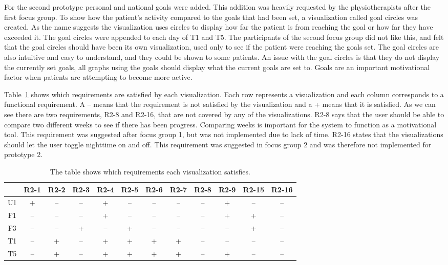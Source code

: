 For the second prototype personal and national goals were added. This addition was heavily requested by the physiotherapists after the first focus group. To show how the patient's activity compared to the goals that had been set, a visualization called goal circles was created. As the name suggests the visualization uses circles to display how far the patient is from reaching the goal or how far they have exceeded it. The goal circles were appended to each day of T1 and T5. The participants of the second focus group did not like this, and felt that the goal circles should have been its own visualization, used only to see if the patient were reaching the goals set. The goal circles are also intuitive and easy to understand, and they could be shown to some patients. An issue with the goal circles is that they do not display the currently set goals, all graphs using the goals should display what the current goals are set to. Goals are an important motivational factor when patients are attempting to become more active.

Table~\ref{tab:reqSat} shows which requirements are satisfied by each visualization. Each row represents a visualization and each column corresponds to a functional requirement. A -- means that the requirement is not satisfied by the visualization and a + means that it is satisfied. As we can see there are two requirements, R2-8 and R2-16, that are not covered by any of the visualizations. R2-8 says that the user should be able to compare two different weeks to see if there has been progress. Comparing weeks is important for the system to function as a motivational tool. This requirement was suggested after focus group 1, but was not implemented due to lack of time. R2-16 states that the visualizations should let the user toggle nighttime on and off. This requirement was suggested in focus group 2 and was therefore not implemented for prototype 2.

\begin{table}[h!]
  \centering
  \begin{tabular}{|c|c|c|c|c|c|c|c|c|c|c|c|}
    \hline
    & R2-1 & R2-2 & R2-3 & R2-4 & R2-5 & R2-6 & R2-7 & R2-8 & R2-9 & R2-15 & R2-16 \\ \hline
    U1 & + & -- & -- & + & -- & -- & -- & -- & + & -- & -- \\ \hline
    F1 & -- & -- & -- & + & -- & -- & -- & -- & + & + & -- \\ \hline
    F3 & -- & -- & + & -- & + & -- & -- & -- & -- & + & -- \\ \hline
    T1 & -- & + & -- & + & + & + & + & -- & -- & -- & -- \\ \hline
    T5 & -- & + & -- & + & + & + & + & -- & + & -- & -- \\ \hline
  \end{tabular}
  \caption[Requirements and visualizations]{The table shows which requirements each visualization satisfies.}
  \label{tab:reqSat}
\end{table} 

